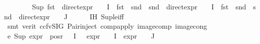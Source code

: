 \begin{isabellebody}
\ \ \ \ \ \ \ \ {\isacharparenleft}{\kern0pt}Sup\ {\isacharparenleft}{\kern0pt}{\isacharparenleft}{\kern0pt}fst\ {\isasymcirc}\ direct{\isacharunderscore}{\kern0pt}expr\ {\isasymcirc}\ {\isasymPhi}{\isacharparenright}{\kern0pt}\ {\isacharbackquote}{\kern0pt}\ I\ {\isasymunion}\ {\isacharparenleft}{\kern0pt}fst\ {\isasymcirc}\ snd\ {\isasymcirc}\ snd\ {\isasymcirc}\ direct{\isacharunderscore}{\kern0pt}expr\ {\isasymcirc}\ {\isasymPhi}{\isacharparenright}{\kern0pt}\ {\isacharbackquote}{\kern0pt}\ I\ {\isasymunion}\ {\isacharparenleft}{\kern0pt}fst\ {\isasymcirc}\ snd\ {\isasymcirc}\ snd\ {\isasymcirc}\ direct{\isacharunderscore}{\kern0pt}expr\ {\isasymcirc}\ {\isasymPhi}{\isacharparenright}{\kern0pt}\ {\isacharbackquote}{\kern0pt}\ J{\isacharparenright}{\kern0pt}{\isacharparenright}{\kern0pt}{\isachardoublequoteclose}\isanewline
\ \ \ \ \isamarkupfalse%
\ IH\ Sup{\isacharunderscore}{\kern0pt}le{\isacharunderscore}{\kern0pt}iff\ \isanewline
\ \ \ \ \isamarkupfalse%
\ {\isacharparenleft}{\kern0pt}smt\ {\isacharparenleft}{\kern0pt}verit{\isacharcomma}{\kern0pt}\ ccfv{\isacharunderscore}{\kern0pt}SIG{\isacharparenright}{\kern0pt}\ Pair{\isacharunderscore}{\kern0pt}inject\ comp{\isacharunderscore}{\kern0pt}apply\ image{\isacharunderscore}{\kern0pt}comp\ image{\isacharunderscore}{\kern0pt}cong{\isacharparenright}{\kern0pt}\isanewline
\ \ \isamarkupfalse%
\ e{}{\isacharcolon}{\kern0pt}\ {\isachardoublequoteopen}Sup\ {\isacharparenleft}{\kern0pt}{\isacharparenleft}{\kern0pt}expr{\isacharunderscore}{\kern0pt}{}\ {\isacharbackquote}{\kern0pt}\ {\isacharparenleft}{\kern0pt}pos{\isacharunderscore}{\kern0pt}r\ {\isacharparenleft}{\kern0pt}{\isasymPhi}\ {\isacharbackquote}{\kern0pt}\ I{\isacharparenright}{\kern0pt}{\isacharparenright}{\kern0pt}{\isacharparenright}{\kern0pt}\ \ {\isasymunion}\ {\isacharparenleft}{\kern0pt}expr{\isacharunderscore}{\kern0pt}{}\ {\isasymcirc}\ {\isasymPhi}{\isacharparenright}{\kern0pt}\ {\isacharbackquote}{\kern0pt}\ I\ {\isasymunion}\ {\isacharparenleft}{\kern0pt}expr{\isacharunderscore}{\kern0pt}{}\ {\isasymcirc}\ {\isasymPhi}{\isacharparenright}{\kern0pt}\ {\isacharbackquote}{\kern0pt}\ J{\isacharparenright}{\kern0pt}\ {\isacharequal}{\kern0pt}\isanewline

\end{isabellebody}
